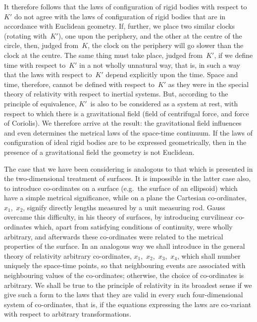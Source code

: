 \documentclass[12pt]{book}[2005/09/16]
\newcommand{\PageSep}[1]{\ignorespaces}
\begin{document}
It therefore follows that the laws of configuration of
rigid bodies with respect to~$K'$ do not agree with the
laws of configuration of rigid bodies that are in accordance
with Euclidean geometry. If, further, we place two
similar clocks (rotating with~$K'$), one upon the periphery,
and the other at the centre of the circle, then, judged
from~$K$, the clock on the periphery will go slower than
the clock at the centre. The same thing must take place,
judged from~$K'$, if we define time with respect to~$K'$ in
a not wholly unnatural way, that is, in such a way that
the laws with respect to~$K'$ depend explicitly upon the
time. Space and time, therefore, cannot be defined
with respect to~$K'$ as they were in the special theory of
relativity with respect to inertial systems. But, according
to the principle of equivalence, $K'$~is also to be considered
as a system at rest, with respect to which there
is a gravitational field (field of centrifugal force, and
%
force of Coriolis). We therefore arrive at the result:
the gravitational field influences and even determines the
metrical laws of the space-time continuum. If the laws
of configuration of ideal rigid bodies are to be expressed
geometrically, then in the presence of a gravitational
field the geometry is not Euclidean.
\PageSep{68}

The case that we have been considering is analogous
to that which is presented in the two-dimensional treatment
of surfaces. It is impossible in the latter case
also, to introduce co-ordinates on a surface (e.g.~the
surface of an ellipsoid) which have a simple metrical
significance, while on a plane the Cartesian co-ordinates,
$x_{1}$,~$x_{2}$, signify directly lengths measured by a unit
measuring rod. Gauss overcame this difficulty, in his
%
theory of surfaces, by introducing curvilinear co-ordinates
%
which, apart from satisfying conditions of continuity,
were wholly arbitrary, and afterwards these co-ordinates
were related to the metrical properties of the surface.
In an analogous way we shall introduce in the general
theory of relativity arbitrary co-ordinates, $x_{1}$,~$x_{2}$,~$x_{3}$,~$x_{4}$,
which shall number uniquely the space-time points, so
that neighbouring events are associated with neighbouring
values of the co-ordinates; otherwise, the choice of
co-ordinates is arbitrary. We shall be true to the
principle of relativity in its broadest sense if we give
such a form to the laws that they are valid in every
such four-dimensional system of co-ordinates, that is, if
the equations expressing the laws are co-variant with
respect to arbitrary transformations.
\end{document}
